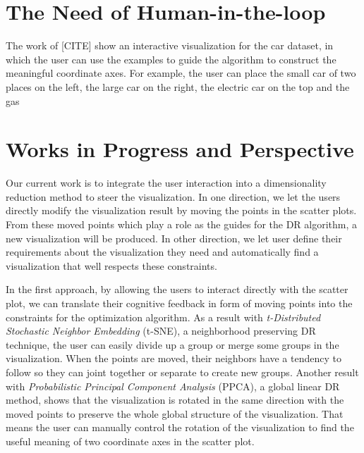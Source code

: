 \section{The Need of Human-in-the-loop}







The work of [CITE] show an interactive visualization for the car dataset, in which the user can use the examples to guide the algorithm to construct the meaningful coordinate axes.
For example, the user can place the small car of two places on the left, the large car on the right, the electric car on the top and the gas

\section{Works in Progress and Perspective}

Our current work is to integrate the user interaction into a dimensionality reduction method to steer the visualization.
In one direction, we let the users directly modify the visualization result by moving the points in the scatter plots.
From these moved points which play a role as the guides for the DR algorithm, a new visualization will be produced.
In other direction, we let user define their requirements about the visualization they need and automatically find a visualization that well respects these constraints.

In the first approach, by allowing the users to interact directly with the scatter plot, we can translate their cognitive feedback in form of moving points into the constraints for the optimization algorithm.
As a result with \emph{t-Distributed Stochastic Neighbor Embedding} (t-SNE), a neighborhood preserving DR technique, the user can easily divide up a group or merge some groups in the visualization.
When the points are moved, their neighbors have a tendency to follow so they can joint together or separate to create new groups.
Another result with \emph{Probabilistic Principal Component Analysis} (PPCA), a global linear DR method, shows that the visualization is rotated in the same direction with the moved points to preserve the whole global structure of the visualization. That means the user can manually control the rotation of the visualization to find the useful meaning of two coordinate axes in the scatter plot.


